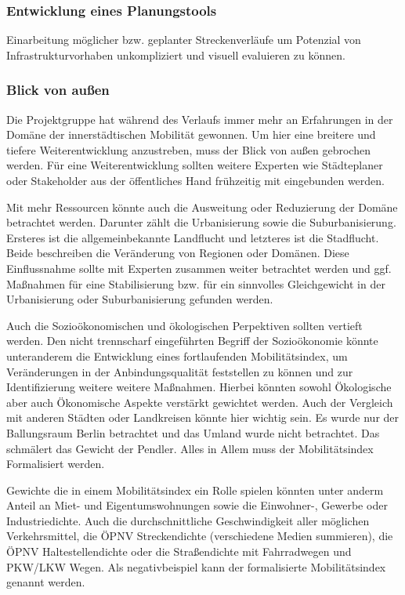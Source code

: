 \subsubsection{Entwicklung eines Planungstools}
Einarbeitung möglicher bzw. geplanter Streckenverläufe um Potenzial von Infrastrukturvorhaben unkompliziert und visuell evaluieren zu können.

\subsubsection{Blick von außen}
Die Projektgruppe hat während des Verlaufs immer mehr an Erfahrungen in der Domäne der innerstädtischen Mobilität gewonnen. Um hier eine breitere und tiefere Weiterentwicklung anzustreben, muss der Blick von außen gebrochen werden.
Für eine Weiterentwicklung sollten weitere Experten wie Städteplaner oder Stakeholder aus der öffentliches Hand frühzeitig mit eingebunden werden.

Mit mehr Ressourcen könnte auch die Ausweitung oder Reduzierung der Domäne betrachtet werden. Darunter zählt die Urbanisierung sowie die Suburbanisierung.
Ersteres ist die allgemeinbekannte Landflucht und letzteres ist die Stadflucht. Beide beschreiben die Veränderung von Regionen oder Domänen. 
Diese Einflussnahme sollte mit Experten zusammen weiter betrachtet werden und ggf. Maßnahmen für eine Stabilisierung bzw. für ein sinnvolles Gleichgewicht in der Urbanisierung oder Suburbanisierung gefunden werden.

Auch die Sozioökonomischen und ökologischen Perpektiven sollten vertieft werden. 
Den nicht trennscharf eingeführten Begriff der Sozioökonomie könnte unteranderem die Entwicklung eines fortlaufenden Mobilitätsindex, um Veränderungen in der Anbindungsqualität feststellen zu können und zur Identifizierung weitere weitere Maßnahmen.
Hierbei könnten sowohl Ökologische aber auch Ökonomische Aspekte verstärkt gewichtet werden. %
Auch der Vergleich mit anderen Städten oder Landkreisen könnte hier wichtig sein. Es wurde nur der Ballungsraum Berlin betrachtet und das Umland wurde nicht betrachtet. Das schmälert das Gewicht der Pendler. Alles in Allem muss der Mobilitätsindex Formalisiert werden. 

Gewichte die in einem Mobilitätsindex ein Rolle spielen könnten unter anderm Anteil an Miet- und Eigentumswohnungen sowie die Einwohner-, 
Gewerbe oder Industriedichte. Auch die durchschnittliche Geschwindigkeit aller möglichen Verkehrsmittel, 
die ÖPNV Streckendichte (verschiedene Medien summieren), die ÖPNV Haltestellendichte oder die Straßendichte mit Fahrradwegen und PKW/LKW Wegen.
Als negativbeispiel kann der formalisierte Mobilitätsindex genannt werden.

